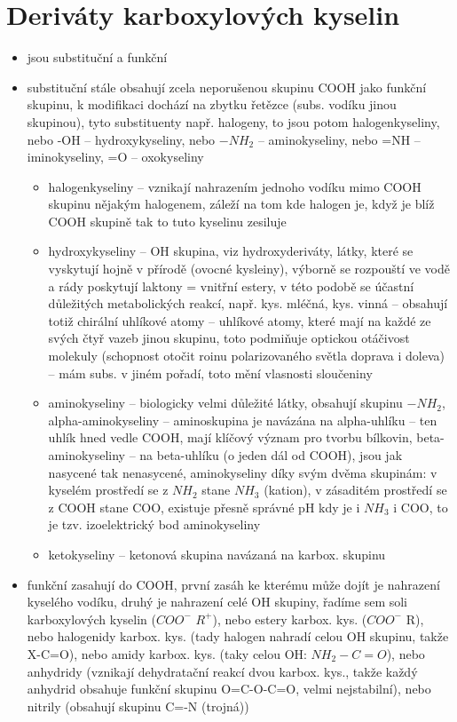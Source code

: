 \documentclass{article}
\begin{document}
\section{Deriváty karboxylových kyselin}
\begin{itemize}
  \item jsou substituční a funkční
  \item substituční stále obsahují zcela neporušenou skupinu COOH jako funkční skupinu, k modifikaci dochází na zbytku řetězce (subs. vodíku jinou skupinou), tyto substituenty např. halogeny, to jsou potom halogenkyseliny, nebo -OH -- hydroxykyseliny, nebo $-NH_2$ -- aminokyseliny, nebo =NH -- iminokyseliny, =O -- oxokyseliny
  \begin{itemize}
    \item halogenkyseliny -- vznikají nahrazením jednoho vodíku mimo COOH skupinu nějakým halogenem, záleží na tom kde halogen je, když je blíž COOH skupině tak to tuto kyselinu zesiluje
    \item hydroxykyseliny -- OH skupina, viz hydroxyderiváty, látky, které se vyskytují hojně v přírodě (ovocné kysleiny), výborně se rozpouští ve vodě a rády poskytují laktony = vnitřní estery, v této podobě se účastní důležitých metabolických reakcí, např. kys. mléčná, kys. vinná -- obsahují totiž chirální uhlíkové atomy -- uhlíkové atomy, které mají na každé ze svých čtyř vazeb jinou skupinu, toto podmiňuje optickou otáčivost molekuly (schopnost otočit roinu polarizovaného světla doprava i doleva) -- mám subs. v jiném pořadí, toto mění vlasnosti sloučeniny
    \item aminokyseliny -- biologicky velmi důležité látky, obsahují skupinu $-NH_2$, alpha-aminokyseliny -- aminoskupina je navázána na alpha-uhlíku -- ten uhlík hned vedle COOH, mají klíčový význam pro tvorbu bílkovin, beta-aminokyseliny -- na beta-uhlíku (o jeden dál od COOH), jsou jak nasycené tak nenasycené, aminokyseliny díky svým dvěma skupinám: v kyselém prostředí se z $NH_2$ stane $NH_3$ (kation), v zásaditém prostředí se z COOH stane COO, existuje přesně správné pH kdy je i $NH_3$ i COO, to je tzv. izoelektrický bod aminokyseliny
    \item ketokyseliny -- ketonová skupina navázaná na karbox. skupinu
  \end{itemize}
  \item funkční zasahují do COOH, první zasáh ke kterému může dojít je nahrazení kyselého vodíku, druhý je nahrazení celé OH skupiny, řadíme sem soli karboxylových kyselin ($COO^-$ $R^+$), nebo estery karbox. kys. ($COO^-$ R), nebo halogenidy karbox. kys. (tady halogen nahradí celou OH skupinu, takže X-C=O), nebo amidy karbox. kys. (taky celou OH: $NH_2-C=O$), nebo anhydridy (vznikají dehydratační reakcí dvou karbox. kys., takže každý anhydrid obsahuje funkční skupinu O=C-O-C=O, velmi nejstabilní), nebo nitrily (obsahují skupinu C=-N (trojná))

\end{itemize}
\end{document}
